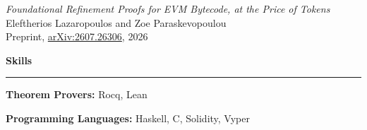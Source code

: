 \documentclass[11pt, a4paper]{article}
\newcommand{\sectionrule}[1]{%
  \vspace{0.8em}
  {\large\textbf{#1}}\\[-0.5em]
  \rule{\linewidth}{0.4pt}
  \vspace{0.2em}
}
\begin{document}
\vspace{0.5em}

\textit{Foundational Refinement Proofs for EVM Bytecode, at the Price of Tokens} \\
Eleftherios Lazaropoulos and Zoe Paraskevopoulou \\
{\small Preprint, \href{https://arxiv.org/abs/2607.26306}{arXiv:2607.26306}, 2026}

\sectionrule{Skills}

\textbf{Theorem Provers:} Rocq, Lean

\textbf{Programming Languages:} Haskell, C, Solidity, Vyper
\end{document}
